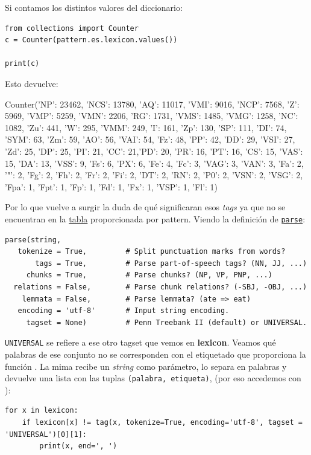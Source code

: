 Si contamos los distintos valores del diccionario:
\begin{verbatim}
from collections import Counter
c = Counter(pattern.es.lexicon.values())

print(c)
\end{verbatim}
Esto devuelve:
\begin{cverbatim}
Counter({'NP': 23462, 'NCS': 13780, 'AQ': 11017, 'VMI': 9016,
         'NCP': 7568, 'Z': 5969, 'VMP': 5259, 'VMN': 2206, 'RG': 1731,
         'VMS': 1485, 'VMG': 1258, 'NC': 1082, 'Zu': 441, 'W': 295,
         'VMM': 249, 'I': 161, 'Zp': 130, 'SP': 111, 'DI': 74, 'SYM': 63,
         'Zm': 59, 'AO': 56, 'VAI': 54, 'Fz': 48, 'PP': 42, 'DD': 29,
         'VSI': 27, 'Zd': 25, 'DP': 25, 'PI': 21, 'CC': 21,'PD': 20,
         'PR': 16, 'PT': 16, 'CS': 15, 'VAS': 15, 'DA': 13, 'VSS': 9,
         'Fs': 6, 'PX': 6, 'Fe': 4, 'Fc': 3, 'VAG': 3, 'VAN': 3, 'Fa': 2,
         '"': 2, 'Fg': 2, 'Fh': 2, 'Fr': 2, 'Fi': 2, 'DT': 2, 'RN': 2,
         'P0': 2, 'VSN': 2, 'VSG': 2, 'Fpa': 1, 'Fpt': 1, 'Fp': 1, 'Fd': 1,
         'Fx': 1, 'VSP': 1, 'Fl': 1})
\end{cverbatim}

Por lo que vuelve a surgir la duda de qué significaran esos \emph{tags}
ya que no se encuentran en la
\href{https://www.clips.uantwerpen.be/pages/MBSP-tags}{tabla}
proporcionada por pattern. Viendo la definición de
\href{https://www.clips.uantwerpen.be/pages/pattern-en}{\texttt{parse}}:

\begin{verbatim}
parse(string,
   tokenize = True,         # Split punctuation marks from words?
       tags = True,         # Parse part-of-speech tags? (NN, JJ, ...)
     chunks = True,         # Parse chunks? (NP, VP, PNP, ...)
  relations = False,        # Parse chunk relations? (-SBJ, -OBJ, ...)
    lemmata = False,        # Parse lemmata? (ate => eat)
   encoding = 'utf-8'       # Input string encoding.
     tagset = None)         # Penn Treebank II (default) or UNIVERSAL.
\end{verbatim}

\texttt{UNIVERSAL} se refiere a ese otro tagset que vemos en
\textbf{lexicon}. Veamos qué palabras de ese conjunto no se corresponden con el etiquetado que proporciona la función . La mima recibe un \emph{string} como parámetro, lo separa en palabras y devuelve una lista con las tuplas \texttt{(palabra, etiqueta)}, (por eso accedemos con \ctexttt{[0][1]}):

\begin{verbatim}
for x in lexicon:
	if lexicon[x] != tag(x, tokenize=True, encoding='utf-8', tagset = 'UNIVERSAL')[0][1]:
		print(x, end=', ')
\end{verbatim}

